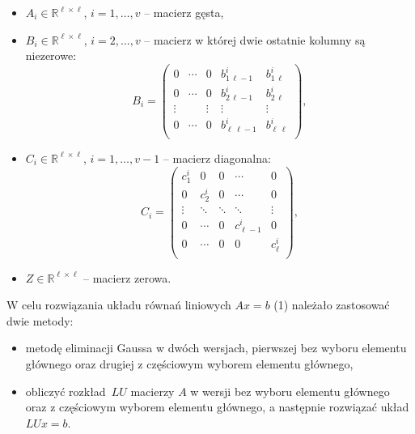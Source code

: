 \documentclass[12pt, a4paper]{article}
\begin{document}
\begin{itemize}
  \item $A_i \in \mathbb{R}^{\ell\times \ell}$,   $i = 1, \ldots,v$ -- macierz gęsta,
  
  \item $B_i \in \mathbb{R}^{\ell\times \ell}$,   $i = 2, \ldots,v$ -- macierz w której dwie ostatnie kolumny są niezerowe:
\begin{equation}
B_i =
\left(\begin{array}{ccccc}
0 & \cdots & 0 & b_{1\,\ell-1}^i & b_{1\,\ell}^i \\
0 & \cdots & 0 & b_{2\,\ell-1}^i & b_{2\,\ell}^i \\
\vdots & & \vdots & \vdots & \vdots \\
0 & \cdots & 0 & b_{\ell\,\ell-1}^i & b_{\ell\,\ell}^i \\
\end{array}\right),
\end{equation} 

\item $C_i \in \mathbb{R}^{\ell\times \ell}$,   $i = 1, \ldots,v\!-\!1$ -- macierz diagonalna:
\begin{equation}
C_i =
\left(\begin{array}{ccccc}
 c_{1}^i & 0 & 0 & \cdots & 0  \\
0 &  c_{2}^i &  0 & \cdots & 0  \\
\vdots &  \ddots &  \ddots & \ddots & \vdots  \\
0 & \cdots & 0 &  c_{\ell-1}^i & 0 \\
0 & \cdots & 0 &  0 & c_{\ell}^i \\
\end{array}\right),
\end{equation} 

\item $Z \in \mathbb{R}^{\ell\times \ell}$ -- macierz zerowa. 
\end{itemize}

\noindent W celu rozwiązania układu równań liniowych $Ax = b$ (1) należało zastosować dwie metody:
\begin{itemize}
\item metodę eliminacji Gaussa w dwóch wersjach, pierwszej bez wyboru elementu głównego oraz drugiej z częściowym wyborem elementu głównego,   
\item obliczyć rozkład~$LU$ macierzy $A$ w wersji bez wyboru elementu głównego oraz z częściowym wyborem elementu głównego, a następnie rozwiązać układ $LUx = b$.
\end{itemize}
\end{document}
